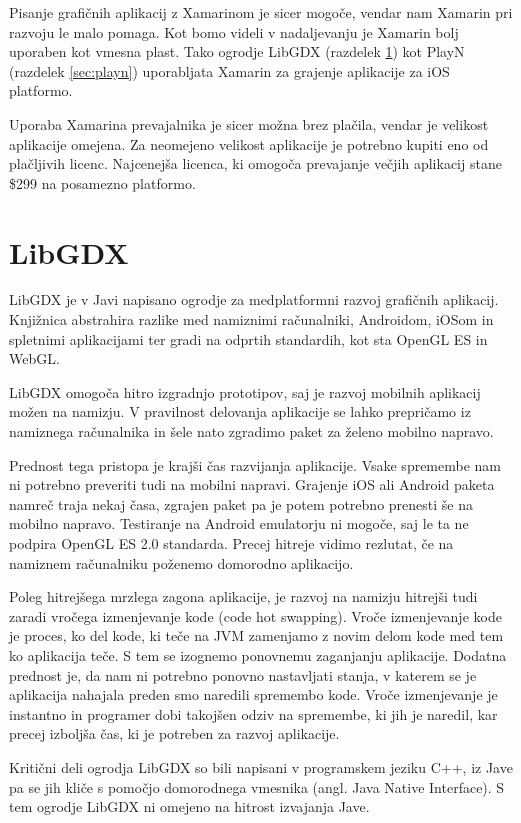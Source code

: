 Pisanje grafičnih aplikacij z Xamarinom je sicer mogoče, vendar nam Xamarin pri razvoju le malo pomaga. Kot bomo videli v nadaljevanju je Xamarin bolj uporaben kot vmesna plast. Tako ogrodje LibGDX (razdelek \ref{sec:libgdx}) kot PlayN (razdelek \ref{sec:playn}) uporabljata Xamarin za grajenje aplikacije za iOS platformo.

Uporaba Xamarina prevajalnika je sicer možna brez plačila, vendar je velikost aplikacije omejena. Za neomejeno velikost aplikacije je potrebno kupiti eno od plačljivih licenc. Najcenejša licenca, ki omogoča prevajanje večjih aplikacij stane \$299 na posamezno platformo.

\section{LibGDX}
\label{sec:libgdx}
LibGDX \cite{libgdx} je v Javi napisano ogrodje za medplatformni razvoj grafičnih aplikacij. Knjižnica abstrahira razlike med namiznimi računalniki, Androidom, iOSom in spletnimi aplikacijami ter gradi na odprtih standardih, kot sta OpenGL ES in WebGL.

LibGDX omogoča hitro izgradnjo prototipov, saj je razvoj mobilnih aplikacij možen na namizju. V pravilnost delovanja aplikacije se lahko prepričamo iz namiznega računalnika in šele nato zgradimo paket za želeno mobilno napravo. 

Prednost tega pristopa je krajši čas razvijanja aplikacije. Vsake spremembe nam ni potrebno preveriti tudi na mobilni napravi. Grajenje iOS ali Android paketa namreč traja nekaj časa, zgrajen paket pa je potem potrebno prenesti še na mobilno napravo. Testiranje na Android emulatorju ni mogoče, saj le ta ne podpira OpenGL ES 2.0 standarda. Precej hitreje vidimo rezlutat, če na namiznem računalniku poženemo domorodno aplikacijo.

Poleg hitrejšega mrzlega zagona aplikacije, je razvoj na namizju hitrejši tudi zaradi vročega izmenjevanje kode (code hot swapping). Vroče izmenjevanje kode je proces, ko del kode, ki teče na JVM zamenjamo z novim delom kode med tem ko aplikacija teče. S tem se izognemo ponovnemu zaganjanju aplikacije. Dodatna prednost je, da nam ni potrebno ponovno nastavljati stanja, v katerem se je aplikacija nahajala preden smo naredili spremembo kode. Vroče izmenjevanje je instantno in programer dobi takojšen odziv na spremembe, ki jih je naredil, kar precej izboljša čas, ki je potreben za razvoj aplikacije.

Kritični deli ogrodja LibGDX so bili napisani v programskem jeziku C++, iz Jave pa se jih kliče s pomočjo domorodnega vmesnika (angl. Java Native Interface). S tem ogrodje LibGDX ni omejeno na hitrost izvajanja Jave.

